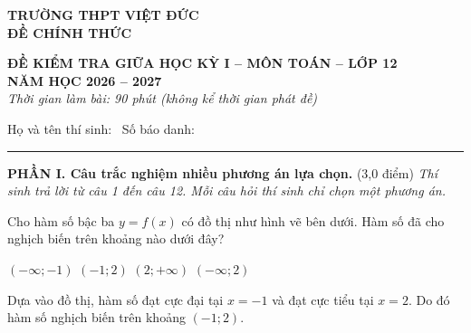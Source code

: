 \noindent
\begin{minipage}[t]{0.38\textwidth}
  \centering
  \textbf{TRƯỜNG THPT VIỆT ĐỨC}\\
  \textbf{ĐỀ CHÍNH THỨC}
\end{minipage}
\hfill
\begin{minipage}[t]{0.58\textwidth}
  \centering
  \textbf{ĐỀ KIỂM TRA GIỮA HỌC KỲ I -- MÔN TOÁN -- LỚP 12}\\
  \textbf{NĂM HỌC 2026 -- 2027}\\
  \textit{Thời gian làm bài: 90 phút (không kể thời gian phát đề)}
\end{minipage}
\vspace{0.25cm}
\noindent
Họ và tên thí sinh: \dotfill\ Số báo danh: \dotfill\ \hfill {}
\vspace{0.1cm}
\noindent\rule{\textwidth}{0.5pt}
\vspace{0.3cm}
\noindent
\noindent\textbf{PHẦN I. Câu trắc nghiệm nhiều phương án lựa chọn.} (3,0 điểm) \textit{Thí sinh trả lời từ câu 1 đến câu 12. Mỗi câu hỏi thí sinh chỉ chọn một phương án.}

\begin{ex}
Cho hàm số bậc ba $y = f(x)$ có đồ thị như hình vẽ bên dưới. Hàm số đã cho nghịch biến trên khoảng nào dưới đây?
\begin{center}
\end{center}
\choice
{$(-\infty; -1)$}
{\True $(-1; 2)$}
{$(2; +\infty)$}
{$(-\infty; 2)$}
\begin{loigiai}
Dựa vào đồ thị, hàm số đạt cực đại tại $x = -1$ và đạt cực tiểu tại $x = 2$. Do đó hàm số nghịch biến trên khoảng $(-1; 2)$.
\end{loigiai}
\end{ex}


